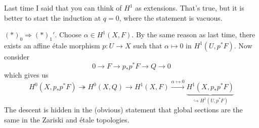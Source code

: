 

 Last time I said that you can think of $H^1$ as extensions. That's true, but it is
 better to start the induction at $q=0$, where the statement is vacuous.

 $(*)_0\Rightarrow (*)_1'$. Choose $\alpha\in H^1(X,F)$. By the same reason as last time,
 there exists an affine \'etale morphism $p:U\to X$ such that $\alpha\mapsto 0$ in
 $H^1(U,p^*F)$. Now consider
 \[
    0\to F\to p_*p^*F\to Q\to 0
 \]
 which gives us
 \[
    H^0(X,p_*p^*F)\twoheadrightarrow H^0(X,Q)\to H^1(X,F)\xrightarrow{\alpha\mapsto 0}
    \underbrace{H^1(X,p_*p^*F)}_{\hookrightarrow H^1(U,p^*F)}
 \]
 The descent is hidden in the (obvious) statement that global sections are the same in
 the Zariski and \'etale topologies.

